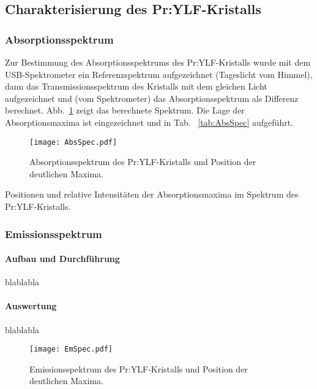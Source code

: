 \subsection{Charakterisierung des Pr:YLF-Kristalls}

\subsubsection{Absorptionsspektrum}

Zur Bestimmung des Absorptionsspektrums des Pr:YLF-Kristalls wurde mit dem USB-Spektrometer ein
Referenzspektrum aufgezeichnet (Tageslicht vom Himmel), dann das Transmissionsspektrum des Kristalls
mit dem gleichen Licht aufgezeichnet und (vom Spektrometer) das Absorptionsspektrum als Differenz
berechnet.
Abb.~\ref{img:AbsSpec} zeigt das berechnete Spektrum.
Die Lage der Absorptionsmaxima ist eingezeichnet und in Tab.~ \ref{tab:AbsSpec} aufgeführt.

\begin{figure}[H]
\begin{center}
  \texttt{[image: AbsSpec.pdf]}
  \caption{Absorptionsspektrum des Pr:YLF-Kristalls und Position der deutlichen Maxima.}
  \label{img:AbsSpec}
\end{center}
\end{figure}

\begin{table}[htb]
\caption{Positionen und relative Intensitäten der Absorptionsmaxima im Spektrum des
Pr:YLF-Kristalls.}

\label{tab:AbsSpec}
\end{table}


\subsubsection{Emissionsspektrum}

\paragraph{Aufbau und Durchführung}
blablabla

\paragraph{Auswertung}

blablabla

\begin{figure}[H]
\begin{center}
  \texttt{[image: EmSpec.pdf]}
  \caption{Emissionsspektrum des Pr:YLF-Kristalls und Position der deutlichen Maxima.}
  \label{img:EmSpec}
\end{center}
\end{figure}

